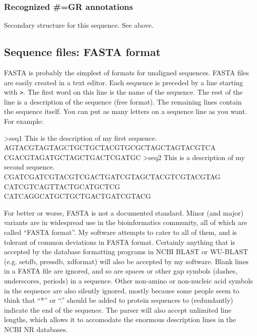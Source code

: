 \subsubsection{Recognized \#=GR annotations}

\begin{sreitems}{}
\item [\emprog{SS}]
	Secondary structure for this sequence. See  above. 
\end{sreitems}

\subsection{Sequence files: FASTA format}

FASTA is probably the simplest of formats for unaligned sequences.
FASTA files are easily created in a text editor.  Each sequence is
preceded by a line starting with \verb+>+. The first word on this line
is the name of the sequence. The rest of the line is a description of
the sequence (free format). The remaining lines contain the sequence
itself. You can put as many letters on a sequence line as you want.
For example:

\begin{sreoutput}
>seq1 This is the description of my first sequence.
AGTACGTAGTAGCTGCTGCTACGTGCGCTAGCTAGTACGTCA CGACGTAGATGCTAGCTGACTCGATGC
>seq2 This is a description of my second sequence.
CGATCGATCGTACGTCGACTGATCGTAGCTACGTCGTACGTAG CATCGTCAGTTACTGCATGCTCG
CATCAGGCATGCTGCTGACTGATCGTACG
\end{sreoutput}

For better or worse, FASTA is not a documented standard. Minor (and
major) variants are in widespread use in the bioinformatics community,
all of which are called ``FASTA format''. My software attempts to
cater to all of them, and is tolerant of common deviations in FASTA
format. Certainly anything that is accepted by the database formatting
programs in NCBI BLAST or WU-BLAST (e.g. setdb, pressdb, xdformat)
will also be accepted by my software. Blank lines in a FASTA file are
ignored, and so are spaces or other gap symbols (dashes, underscores,
periods) in a sequence. Other non-amino or non-nucleic acid symbols in
the sequence are also silently ignored, mostly because some people
seem to think that ``*'' or ``.'' should be added to protein sequences
to (redundantly) indicate the end of the sequence. The parser will
also accept unlimited line lengths, which allows it to accomodate the
enormous description lines in the NCBI NR databases.

